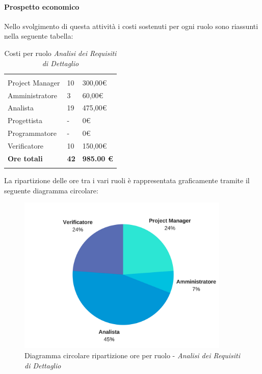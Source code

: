 			\paragraph{Prospetto economico} \Spazio
			Nello svolgimento di questa attività i costi sostenuti per ogni ruolo sono riassunti nella seguente tabella:
			\begin{table}[H]
			\centering
			\begin{tabular}{|p{4cm}|C{4cm}|C{4cm}|}
				
				 & &\\
				Project Manager & 10 & 300,00\euro \\
				\hline
				Amministratore& 3 & 60,00\euro \\
				\hline
				Analista & 19 & 475,00\euro \\
				\hline
				Progettista & - & 0\euro \\
				\hline
				Programmatore & - & 0\euro \\
				\hline
				Verificatore & 10 & 150,00\euro \\
				\hline
				\textbf{Ore totali} & \textbf{42} & \textbf{985.00 \euro} \\
			\end{tabular}
			\caption{Costi per ruolo \textit{Analisi dei Requisiti di Dettaglio}}
		\end{table}
		
		La ripartizione delle ore tra i vari ruoli è rappresentata graficamente tramite il seguente diagramma circolare:

			\begin{figure}[H] 
			\centering 
			\includegraphics[width=0.9\textwidth]{images/CircolareAnalisiRequisitiDiDettaglio.png} 
			\caption{Diagramma circolare ripartizione ore per ruolo - \textit{Analisi dei Requisiti di Dettaglio}}
			\label{CircolareAnalisiRequisitiDiDettaglio}
			\end{figure}
		


